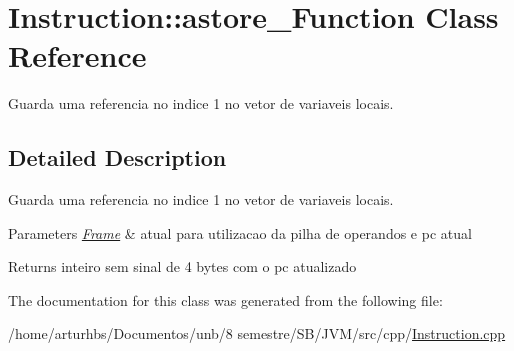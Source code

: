 \hypertarget{classInstruction_1_1astore__1Function}{}\section{Instruction\+:\+:astore\+\_\+Function Class Reference}
\label{classInstruction_1_1astore__1Function}


Guarda uma referencia no indice 1 no vetor de variaveis locais.  




\subsection{Detailed Description}
Guarda uma referencia no indice 1 no vetor de variaveis locais. 


\begin{DoxyParams}{Parameters}
{\em \hyperlink{classFrame}{Frame}} & atual para utilizacao da pilha de operandos e pc atual \\
\hline
\end{DoxyParams}
\begin{DoxyReturn}{Returns}
inteiro sem sinal de 4 bytes com o pc atualizado 
\end{DoxyReturn}


The documentation for this class was generated from the following file\+:\begin{DoxyCompactItemize}
\item 
/home/arturhbs/\+Documentos/unb/8 semestre/\+S\+B/\+J\+V\+M/src/cpp/\hyperlink{Instruction_8cpp}{Instruction.\+cpp}\end{DoxyCompactItemize}
